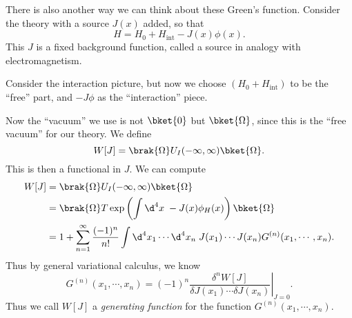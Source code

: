 \documentclass[a4paper]{article}
\begin{document}
%

There is also another way we can think about these Green's function. Consider the theory with a source $J(x)$ added, so that
\[
  H = H_0 + H_{\mathrm{int}} - J(x) \phi(x).
\]
This $J$ is a fixed background function, called a source in analogy with electromagnetism.

Consider the interaction picture, but now we choose $(H_0 + H_{\mathrm{int}})$ to be the ``free'' part, and $-J \phi$ as the ``interaction'' piece.

Now the ``vacuum'' we use is not $\bket{0}$ but $\bket{\Omega}$, since this is the ``free vacuum'' for our theory.
We define
\[
  W[J] = \brak{\Omega}U_I(-\infty, \infty) \bket{\Omega}.
\]
This is then a functional in $J$. We can compute
\begin{align*}
  W[J] &= \brak{\Omega}U_I(-\infty, \infty) \bket{\Omega}\\
  &= \brak{\Omega} T \exp\left(\int \d^4 x\; -J(x) \phi_H(x)\right)\bket{\Omega}\\
  &= 1 + \sum_{n = 1}^\infty \frac{(-1)^n}{n!} \int \d^4 x_1 \cdots \d^4 x_n \; J(x_1) \cdots J(x_n) G^{(n)}(x_1, \cdots, x_n).
\end{align*}
Thus by general variational calculus, we know
\[
  G^{(n)}(x_1, \cdots, x_n) = (-1)^n \left.\frac{\delta^n W[J]}{\delta J(x_1) \cdots \delta J(x_n)} \right|_{J = 0}.
\]
Thus we call $W[J]$ a \emph{generating function} for the function $G^{(n)}(x_1, \cdots, x_n)$.
\end{document}
